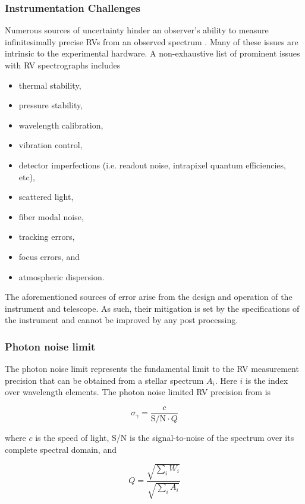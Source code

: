 \subsubsection{Instrumentation Challenges}
Numerous sources of uncertainty hinder an observer's ability to measure infinitesimally precise
RVs from an observed spectrum \citep{podgorski14,halverson16}.
Many of these issues are intrinsic to the experimental
hardware. A non-exhaustive list of prominent issues with RV spectrographs includes

\begin{itemize}
\item thermal stability,
\item pressure stability,
\item wavelength calibration,
\item vibration control,
\item detector imperfections (i.e. readout noise, intrapixel quantum efficiencies, etc),
\item scattered light,
\item fiber modal noise,
\item tracking errors,
\item focus errors, and
\item atmospheric dispersion.
\end{itemize}

\noindent The aforementioned sources of error arise from the design and operation of the
instrument and telescope. As such, their mitigation is set by the specifications of the instrument
and cannot be improved by any post processing. 

\subsubsection{Photon noise limit}
The photon noise limit represents the fundamental limit to the RV measurement precision that can
be obtained from a stellar spectrum $A_i$. Here $i$ is the index over wavelength elements.
The photon noise limited RV precision from \cite{bouchy01} is

\begin{equation}
  \sigma_{\gamma} = \frac{c}{\text{S/N} \cdot Q}
\end{equation}

\noindent where $c$ is the speed of light, S/N is the signal-to-noise of the spectrum over its
complete spectral domain, and

\begin{equation}
  Q = \frac{\sqrt{\sum_i W_i}}{\sqrt{\sum_i A_i}}
\end{equation}

